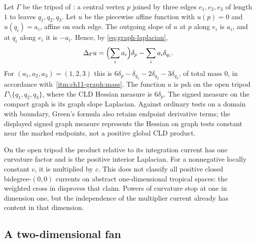 \begin{example}
\label{ex:ch16-tripod-numbers}
Let $\Gamma$ be the tripod of : a central
vertex $p$ joined by three edges $e_1,e_2,e_3$ of length $1$ to leaves
$q_1,q_2,q_3$.  Let $u$ be the piecewise affine
function with $u(p)=0$ and $u(q_i)=a_i$, affine on each edge.  The outgoing
slope of $u$ at $p$ along $e_i$ is $a_i$, and at $q_i$ along $e_i$ it is
$-a_i$.  Hence, by \eqref{eq:graph-laplacian},
\[
 \Delta_\Gamma u
 =\Bigl(\sum_ia_i\Bigr)\delta_p-\sum_ia_i\delta_{q_i}.
\]
For $(a_1,a_2,a_3)=(1,2,3)$ this is
$6\delta_p-\delta_{q_1}-2\delta_{q_2}-3\delta_{q_3}$, of total mass $0$, in
accordance with
\,\cref{itm:ch11-graph:mass}.  The function $u$ is
psh on the open tripod $\Gamma\setminus\{q_1,q_2,q_3\}$, where the
CLD Hessian measure is $6\delta_p$.  The signed measure on the compact
graph is its graph slope Laplacian.  Against ordinary tests on a domain
with boundary, Green's formula also retains endpoint derivative terms;
the displayed signed graph measure represents the Hessian on graph tests
constant near the marked endpoints, not a positive global CLD product.

On the open tripod the product relative to its integration current
has one curvature factor and is the positive interior Laplacian.  For a
nonnegative locally constant $c$, it is multiplied by $c$.  This does not
classify all positive closed bidegree-$(0,0)$ currents on abstract
one-dimensional tropical spaces: the weighted cross in
 disproves that claim.  Powers of curvature stop
at one in dimension one, but the independence of the multiplier current
already has content in that dimension.
\end{example}

\subsection{A two-dimensional fan}
\label{sec:ch16-worked-fan}


